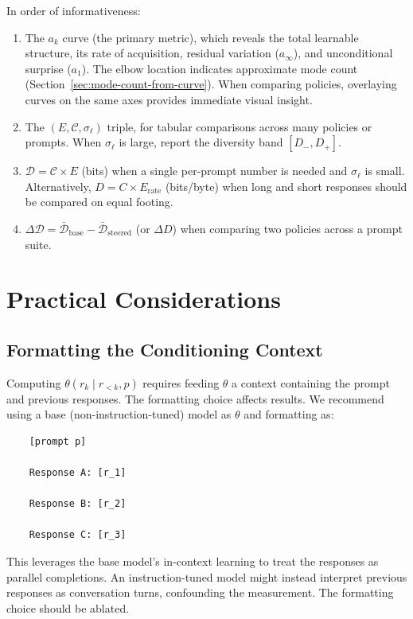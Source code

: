 \documentclass[11pt]{article}
\begin{document}
In order of informativeness:
\begin{enumerate}[nosep]
    \item The $a_k$ curve (the primary metric), which reveals the total learnable structure, its rate of acquisition, residual variation ($a_\infty$), and unconditional surprise ($a_1$). The elbow location indicates approximate mode count (Section~\ref{sec:mode-count-from-curve}). When comparing policies, overlaying curves on the same axes provides immediate visual insight.
    \item The $(E, \mathcal{C}, \sigma_\ell)$ triple, for tabular comparisons across many policies or prompts. When $\sigma_\ell$ is large, report the diversity band $[D_-, D_+]$.
    \item $\mathcal{D} = \mathcal{C} \times E$ (bits) when a single per-prompt number is needed and $\sigma_\ell$ is small. Alternatively, $D = C \times E_{\mathrm{rate}}$ (bits/byte) when long and short responses should be compared on equal footing.
    \item $\Delta\mathcal{D} = \bar{\mathcal{D}}_{\mathrm{base}} - \bar{\mathcal{D}}_{\mathrm{steered}}$ (or $\Delta D$) when comparing two policies across a prompt suite.
\end{enumerate}

\section{Practical Considerations}\label{sec:practical}

\subsection{Formatting the Conditioning Context}

Computing $\theta(r_k \mid r_{<k}, p)$ requires feeding $\theta$ a context containing the prompt and previous responses. The formatting choice affects results. We recommend using a base (non-instruction-tuned) model as $\theta$ and formatting as:

\begin{verbatim}
    [prompt p]

    Response A: [r_1]

    Response B: [r_2]

    Response C: [r_3]
\end{verbatim}

This leverages the base model's in-context learning to treat the responses as parallel completions. An instruction-tuned model might instead interpret previous responses as conversation turns, confounding the measurement. The formatting choice should be ablated.
\end{document}
